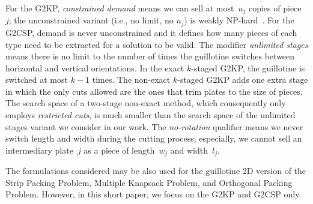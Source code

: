 \documentclass[9pt]{entcs}
\begin{document}
For the G2KP, \emph{constrained demand} means we can sell at most~\(u_j\) copies of piece~\(j\); the unconstrained variant (i.e., no limit, no \(u_j\)) is weakly NP-hard~\cite{beasley:1985:guillotine}. %
For the G2CSP, demand is never unconstrained and it defines how many pieces of each type need to be extracted for a solution to be valid.
The modifier \emph{unlimited stages} means there is no limit to the number of times the guillotine switches between horizontal and vertical orientations.
In the exact \(k\)-staged G2KP, the guillotine is switched at most \(k-1\) times. %
The non-exact \(k\)-staged G2KP adds one extra stage in which the only cuts allowed are the ones that trim plates to the size of pieces.
The search space of a two-stage non-exact method, which consequently only employs \emph{restricted cuts}, is much smaller than the search space of the unlimited stages variant we consider in our work.
The \emph{no-rotation} qualifier means we never switch length and width during the cutting process; especially, we cannot sell an intermediary plate~\(j\) as a piece of length~\(w_j\) and width~\(l_j\).


The formulations considered may be also used for the guillotine 2D version of the Strip Packing Problem, Multiple Knapsack Problem, and Orthogonal Packing Problem.
However, in this short paper, we focus on the G2KP and G2CSP only.
\end{document}
